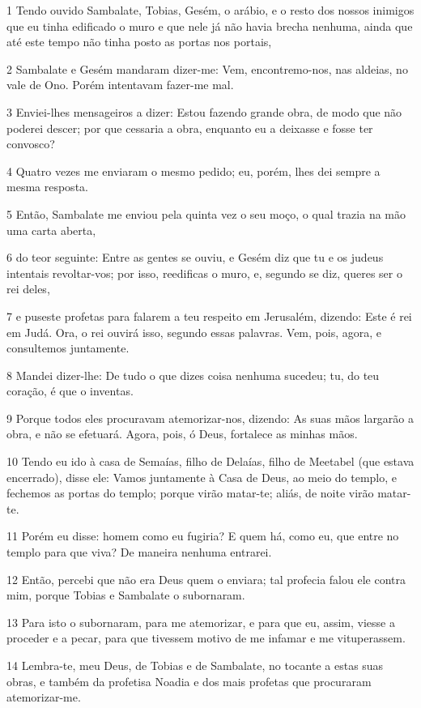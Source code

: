 \par 1 Tendo ouvido Sambalate, Tobias, Gesém, o arábio, e o resto dos nossos inimigos que eu tinha edificado o muro e que nele já não havia brecha nenhuma, ainda que até este tempo não tinha posto as portas nos portais,
\par 2 Sambalate e Gesém mandaram dizer-me: Vem, encontremo-nos, nas aldeias, no vale de Ono. Porém intentavam fazer-me mal.
\par 3 Enviei-lhes mensageiros a dizer: Estou fazendo grande obra, de modo que não poderei descer; por que cessaria a obra, enquanto eu a deixasse e fosse ter convosco?
\par 4 Quatro vezes me enviaram o mesmo pedido; eu, porém, lhes dei sempre a mesma resposta.
\par 5 Então, Sambalate me enviou pela quinta vez o seu moço, o qual trazia na mão uma carta aberta,
\par 6 do teor seguinte: Entre as gentes se ouviu, e Gesém diz que tu e os judeus intentais revoltar-vos; por isso, reedificas o muro, e, segundo se diz, queres ser o rei deles,
\par 7 e puseste profetas para falarem a teu respeito em Jerusalém, dizendo: Este é rei em Judá. Ora, o rei ouvirá isso, segundo essas palavras. Vem, pois, agora, e consultemos juntamente.
\par 8 Mandei dizer-lhe: De tudo o que dizes coisa nenhuma sucedeu; tu, do teu coração, é que o inventas.
\par 9 Porque todos eles procuravam atemorizar-nos, dizendo: As suas mãos largarão a obra, e não se efetuará. Agora, pois, ó Deus, fortalece as minhas mãos.
\par 10 Tendo eu ido à casa de Semaías, filho de Delaías, filho de Meetabel (que estava encerrado), disse ele: Vamos juntamente à Casa de Deus, ao meio do templo, e fechemos as portas do templo; porque virão matar-te; aliás, de noite virão matar-te.
\par 11 Porém eu disse: homem como eu fugiria? E quem há, como eu, que entre no templo para que viva? De maneira nenhuma entrarei.
\par 12 Então, percebi que não era Deus quem o enviara; tal profecia falou ele contra mim, porque Tobias e Sambalate o subornaram.
\par 13 Para isto o subornaram, para me atemorizar, e para que eu, assim, viesse a proceder e a pecar, para que tivessem motivo de me infamar e me vituperassem.
\par 14 Lembra-te, meu Deus, de Tobias e de Sambalate, no tocante a estas suas obras, e também da profetisa Noadia e dos mais profetas que procuraram atemorizar-me.
